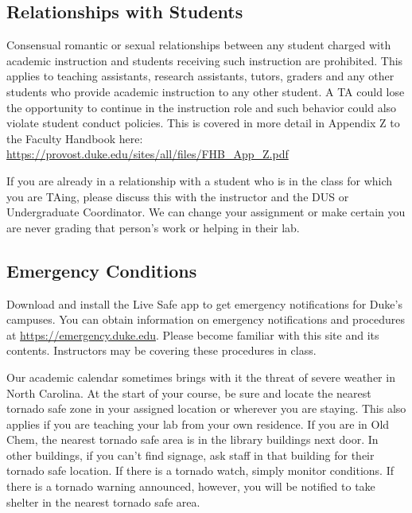 \documentclass[
]{article}
\begin{document}
\hypertarget{relationships-with-students}{%
\subsection{Relationships with Students}\label{relationships-with-students}}

Consensual romantic or sexual relationships between any student charged with academic instruction and students receiving such instruction are prohibited. This applies to teaching assistants, research assistants, tutors, graders and any other students who provide academic instruction to any other student. A TA could lose the opportunity to continue in the instruction role and such behavior could also violate student conduct policies. This is covered in more detail in Appendix Z to the Faculty Handbook here: \url{https://provost.duke.edu/sites/all/files/FHB_App_Z.pdf}

If you are already in a relationship with a student who is in the class for which you are TAing, please discuss this with the instructor and the DUS or Undergraduate Coordinator. We can change your assignment or make certain you are never grading that person's work or helping in their lab.

\hypertarget{emergency-conditions}{%
\subsection{Emergency Conditions}\label{emergency-conditions}}

Download and install the Live Safe app to get emergency notifications for Duke's campuses. You can obtain information on emergency notifications and procedures at \url{https://emergency.duke.edu}. Please become familiar with this site and its contents. Instructors may be covering these procedures in class.

Our academic calendar sometimes brings with it the threat of severe weather in North Carolina. At the start of your course, be sure and locate the nearest tornado safe zone in your assigned location or wherever you are staying. This also applies if you are teaching your lab from your own residence. If you are in Old Chem, the nearest tornado safe area is in the library buildings next door. In other buildings, if you can't find signage, ask staff in that building for their tornado safe location. If there is a tornado watch, simply monitor conditions. If there is a tornado warning announced, however, you will be notified to take shelter in the nearest tornado safe area.
\end{document}
